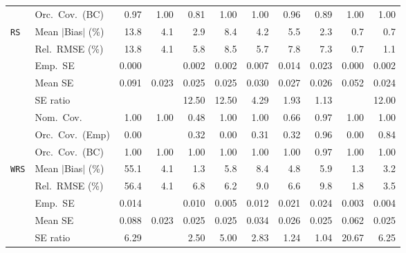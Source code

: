 \begin{landscape}
\begin{longtable}{llrrrrrrrrr}
 & Orc.\ Cov.\ (BC) & \cellcolor{ranktwo}0.97 & \cellcolor{rankthree}1.00 & 0.81 & \cellcolor{rankthree}1.00 & \cellcolor{rankthree}1.00 & \cellcolor{rankone}0.96 & 0.89 & \cellcolor{rankthree}1.00 & \cellcolor{rankthree}1.00 \\
\addlinespace[2pt]
\quad \texttt{RS} & Mean $|$Bias$|$ (\%) & 13.8 & 4.1 & \cellcolor{rankthree}2.9 & 8.4 & 4.2 & 5.5 & \cellcolor{ranktwo}2.3 & \cellcolor{rankone}0.7 & \cellcolor{rankone}0.7 \\
 & Rel.\ RMSE (\%) & 13.8 & \cellcolor{rankthree}4.1 & 5.8 & 8.5 & 5.7 & 7.8 & 7.3 & \cellcolor{rankone}0.7 & \cellcolor{ranktwo}1.1 \\
 & Emp.\ SE & 0.000 &  & 0.002 & 0.002 & 0.007 & 0.014 & 0.023 & 0.000 & 0.002 \\
 & Mean SE & 0.091 & 0.023 & 0.025 & 0.025 & 0.030 & 0.027 & 0.026 & 0.052 & 0.024 \\
 & SE ratio &  &  & 12.50 & 12.50 & \cellcolor{rankthree}4.29 & \cellcolor{ranktwo}1.93 & \cellcolor{rankone}1.13 &  & 12.00 \\
 & Nom.\ Cov. & \cellcolor{ranktwo}1.00 & \cellcolor{ranktwo}1.00 & 0.48 & \cellcolor{ranktwo}1.00 & \cellcolor{ranktwo}1.00 & \cellcolor{rankthree}0.66 & \cellcolor{rankone}0.97 & \cellcolor{ranktwo}1.00 & \cellcolor{ranktwo}1.00 \\
 & Orc.\ Cov.\ (Emp) & 0.00 &  & \cellcolor{rankthree}0.32 & 0.00 & 0.31 & \cellcolor{rankthree}0.32 & \cellcolor{rankone}0.96 & 0.00 & \cellcolor{ranktwo}0.84 \\
 & Orc.\ Cov.\ (BC) & \cellcolor{ranktwo}1.00 & \cellcolor{ranktwo}1.00 & \cellcolor{ranktwo}1.00 & \cellcolor{ranktwo}1.00 & \cellcolor{ranktwo}1.00 & \cellcolor{ranktwo}1.00 & \cellcolor{rankone}0.97 & \cellcolor{ranktwo}1.00 & \cellcolor{ranktwo}1.00 \\
\addlinespace[2pt]
\quad \texttt{WRS} & Mean $|$Bias$|$ (\%) & 55.1 & \cellcolor{rankthree}4.1 & \cellcolor{rankone}1.3 & 5.8 & 8.4 & 4.8 & 5.9 & \cellcolor{rankone}1.3 & \cellcolor{ranktwo}3.2 \\
 & Rel.\ RMSE (\%) & 56.4 & \cellcolor{rankthree}4.1 & 6.8 & 6.2 & 9.0 & 6.6 & 9.8 & \cellcolor{rankone}1.8 & \cellcolor{ranktwo}3.5 \\
 & Emp.\ SE & 0.014 &  & 0.010 & 0.005 & 0.012 & 0.021 & 0.024 & 0.003 & 0.004 \\
 & Mean SE & 0.088 & 0.023 & 0.025 & 0.025 & 0.034 & 0.026 & 0.025 & 0.062 & 0.025 \\
 & SE ratio & 6.29 &  & \cellcolor{rankthree}2.50 & 5.00 & 2.83 & \cellcolor{ranktwo}1.24 & \cellcolor{rankone}1.04 & 20.67 & 6.25 \\

\end{longtable}
\end{landscape}
